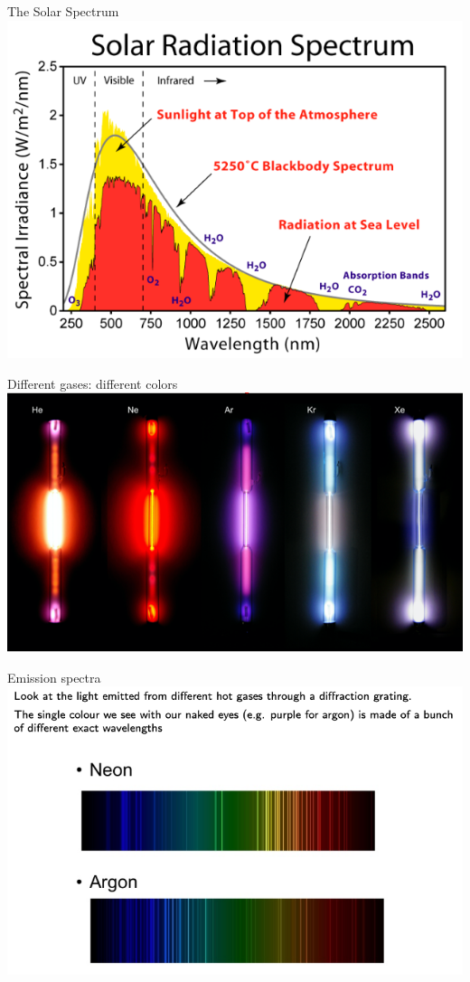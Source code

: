  \begin{frame}{The Solar Spectrum}
\small
\includegraphics[scale=0.4]{spec3}

\end{frame}

 \begin{frame}{Different gases: different colors}
\small
\includegraphics[scale=0.4]{spec4}

\end{frame}

 \begin{frame}{Emission spectra}
\small
\includegraphics[scale=0.4]{spec5}

\end{frame}

